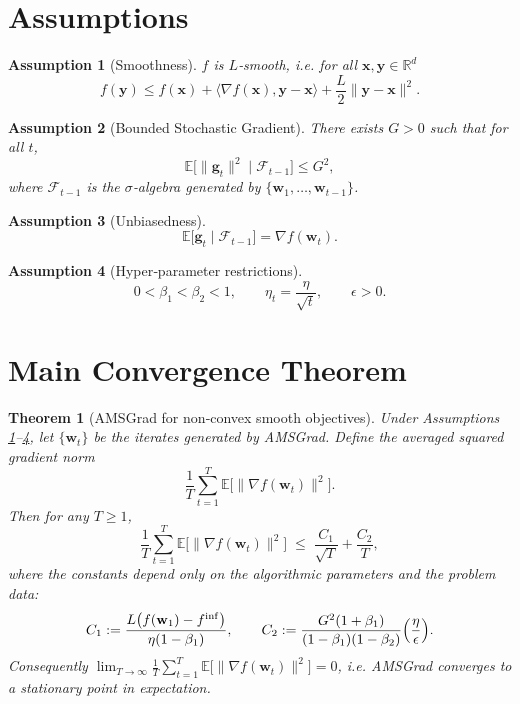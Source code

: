 \documentclass{article}
\newtheorem{theorem}{Theorem}
\newtheorem{assumption}{Assumption}
\begin{document}
\newpage
\section*{Assumptions}
\begin{assumption}[Smoothness]\label{ass:smooth}
$f$ is $L$‑smooth, i.e. for all $\mathbf{x},\mathbf{y}\in\mathbb{R}^d$
\[
f(\mathbf{y})\le f(\mathbf{x})+\langle\nabla f(\mathbf{x}),\mathbf{y}-\mathbf{x}\rangle
+\frac{L}{2}\|\mathbf{y}-\mathbf{x}\|^2 .
\]
\end{assumption}
\begin{assumption}[Bounded Stochastic Gradient]\label{ass:bound}
There exists $G>0$ such that for all $t$,
\[
\mathbb{E}\big[\|\mathbf{g}_t\|^2\mid\mathcal{F}_{t-1}\big]\le G^2,
\]
where $\mathcal{F}_{t-1}$ is the $\sigma$‑algebra generated by $\{\mathbf{w}_1,\dots,\mathbf{w}_{t-1}\}$.
\end{assumption}
\begin{assumption}[Unbiasedness]\label{ass:unbiased}
\[
\mathbb{E}\big[\mathbf{g}_t\mid\mathcal{F}_{t-1}\big]=\nabla f(\mathbf{w}_t).
\]
\end{assumption}
\begin{assumption}[Hyper‑parameter restrictions]\label{ass:hyper}
\[
0<\beta_1<\beta_2<1,\qquad
\eta_t=\frac{\eta}{\sqrt{t}},\qquad
\epsilon>0.
\]
\end{assumption}

\section*{Main Convergence Theorem}
\begin{theorem}[AMSGrad for non‑convex smooth objectives]\label{thm:main}
Under Assumptions \ref{ass:smooth}–\ref{ass:hyper}, let $\{\mathbf{w}_t\}$ be the iterates generated by AMSGrad.
Define the averaged squared gradient norm
\[
\frac{1}{T}\sum_{t=1}^{T}\mathbb{E}\big[\|\nabla f(\mathbf{w}_t)\|^2\big].
\]
Then for any $T\ge 1$,
\[
\frac{1}{T}\sum_{t=1}^{T}\mathbb{E}\big[\|\nabla f(\mathbf{w}_t)\|^2\big]
\;\le\;
\frac{C_1}{\sqrt{T}}+\frac{C_2}{T},
\tag{5}
\]
where the constants depend only on the algorithmic parameters and the problem data:
\[
C_1:=\frac{L\big(f(\mathbf{w}_1)-f^{\inf}\big)}{\eta(1-\beta_1)},
\qquad
C_2:=\frac{G^2(1+\beta_1)}{(1-\beta_1)(1-\beta_2)}\Bigl(\frac{\eta}{\epsilon}\Bigr).
\]
Consequently $\displaystyle\lim_{T\to\infty}\frac{1}{T}\sum_{t=1}^{T}\mathbb{E}\big[\|\nabla f(\mathbf{w}_t)\|^2\big]=0$,
i.e. AMSGrad converges to a stationary point in expectation.
\end{theorem}
\end{document}
